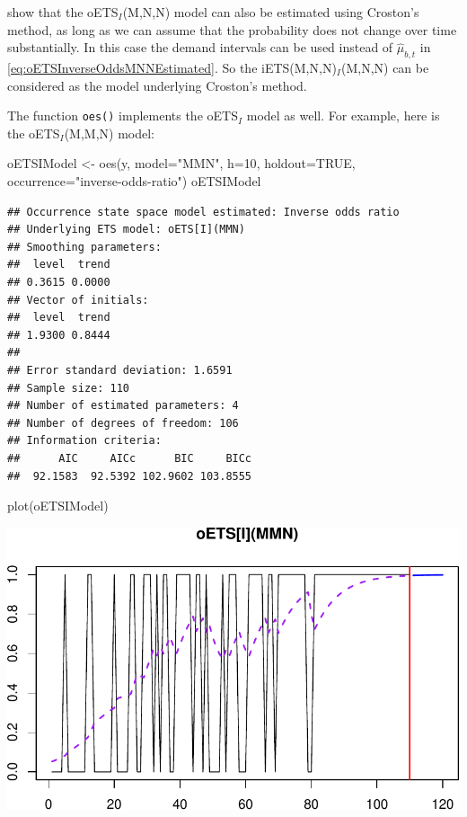 \documentclass[
]{book}
\newenvironment{Shaded}{\begin{snugshade}}{\end{snugshade}}
\newcommand{\AttributeTok}[1]{\textcolor[rgb]{0.77,0.63,0.00}{#1}}
\newcommand{\ConstantTok}[1]{\textcolor[rgb]{0.00,0.00,0.00}{#1}}
\newcommand{\DecValTok}[1]{\textcolor[rgb]{0.00,0.00,0.81}{#1}}
\newcommand{\FunctionTok}[1]{\textcolor[rgb]{0.00,0.00,0.00}{#1}}
\newcommand{\NormalTok}[1]{#1}
\newcommand{\OtherTok}[1]{\textcolor[rgb]{0.56,0.35,0.01}{#1}}
\newcommand{\StringTok}[1]{\textcolor[rgb]{0.31,0.60,0.02}{#1}}
\theoremstyle{definition}
\theoremstyle{definition}
\theoremstyle{definition}
\theoremstyle{definition}
\theoremstyle{remark}
\begin{document}
\citet{Svetunkov2019a} show that the oETS\(_I\)(M,N,N) model can also be estimated using Croston's method, as long as we can assume that the probability does not change over time substantially. In this case the demand intervals can be used instead of \(\hat{\mu}_{b,t}\) in \eqref{eq:oETSInverseOddsMNNEstimated}. So the iETS(M,N,N)\(_I\)(M,N,N) can be considered as the model underlying Croston's method.

The function \texttt{oes()} implements the oETS\(_I\) model as well. For example, here is the oETS\(_I\)(M,M,N) model:

\begin{Shaded}
\begin{Highlighting}[]
\NormalTok{oETSIModel }\OtherTok{\textless{}{-}} \FunctionTok{oes}\NormalTok{(y, }\AttributeTok{model=}\StringTok{"MMN"}\NormalTok{, }\AttributeTok{h=}\DecValTok{10}\NormalTok{, }\AttributeTok{holdout=}\ConstantTok{TRUE}\NormalTok{,}
                  \AttributeTok{occurrence=}\StringTok{"inverse{-}odds{-}ratio"}\NormalTok{)}
\NormalTok{oETSIModel}
\end{Highlighting}
\end{Shaded}

\begin{verbatim}
## Occurrence state space model estimated: Inverse odds ratio
## Underlying ETS model: oETS[I](MMN)
## Smoothing parameters:
##  level  trend 
## 0.3615 0.0000 
## Vector of initials:
##  level  trend 
## 1.9300 0.8444 
## 
## Error standard deviation: 1.6591
## Sample size: 110
## Number of estimated parameters: 4
## Number of degrees of freedom: 106
## Information criteria: 
##      AIC     AICc      BIC     BICc 
##  92.1583  92.5392 102.9602 103.8555
\end{verbatim}

\begin{Shaded}
\begin{Highlighting}[]
\FunctionTok{plot}\NormalTok{(oETSIModel)}
\end{Highlighting}
\end{Shaded}

\includegraphics{adam_files/figure-latex/oETSIExample1-1.pdf}
\end{document}
